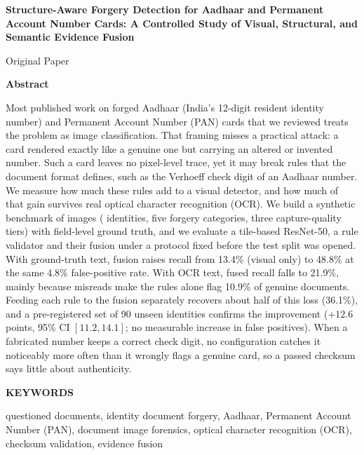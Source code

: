 \documentclass[12pt]{article}
\begin{document}
\begin{center}
{\large\bfseries Structure-Aware Forgery Detection for Aadhaar and Permanent Account Number Cards: A Controlled Study of Visual, Structural, and Semantic Evidence Fusion\par}
\bigskip
Original Paper
\end{center}

\clearpage
\noindent\textbf{Abstract}\par
\noindent Most published work on forged Aadhaar (India's 12-digit resident identity number) and Permanent Account Number (PAN) cards that we reviewed
treats the problem as image classification. That framing misses a practical attack: a card
rendered exactly like a genuine one but carrying an altered or invented
number. Such a card leaves no pixel-level trace, yet it may break
rules that the document format defines, such as the Verhoeff
check digit of an Aadhaar number. We measure how much these rules
add to a visual detector, and how much of that gain survives real optical character recognition (OCR).
We build a synthetic benchmark of \dsImages{}
images (\dsPersons{} identities, five forgery
categories, three capture-quality tiers) with
field-level ground truth, and we evaluate a tile-based ResNet-50, a
rule validator and their fusion under a protocol
fixed before the test split was opened. With ground-truth text, fusion
raises recall from 13.4\% (visual only) to 48.8\% at the same
4.8\% false-positive rate. With OCR text, fused recall falls to 21.9\%,
mainly because misreads make the rules alone flag 10.9\% of genuine documents.
Feeding each rule to the fusion separately recovers about half
of this loss (36.1\%), and a pre-registered set of 90 unseen
identities confirms the improvement ($+12.6$ points, 95\% CI
$[11.2, 14.1]$; no measurable increase in false positives). When a fabricated number keeps a correct check digit, no configuration catches it noticeably more often than it wrongly flags a genuine card, so a passed checksum says little about authenticity.

\bigskip
\noindent\textbf{KEYWORDS}\par
\noindent questioned documents, identity document forgery, Aadhaar, Permanent Account Number (PAN), document image forensics, optical character recognition (OCR), checksum validation, evidence fusion
\end{document}
